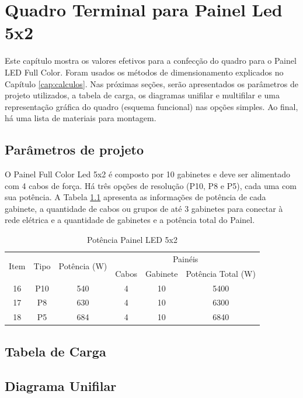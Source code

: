 \chapter{Quadro Terminal para Painel Led 5x2}

Este capítulo mostra os valores efetivos para a confecção do quadro para o Painel LED Full Color. Foram usados os métodos de dimensionamento explicados no Capítulo \ref{cap:calculos}. Nas próximas seções, serão apresentados os parâmetros de projeto utilizados, a tabela de carga, os diagramas unifilar e multifilar e uma representação gráfica do quadro (esquema funcional) nas opções simples. Ao final, há uma lista de materiais para montagem.

\section{Parâmetros de projeto}

O Painel Full Color Led 5x2 é composto por 10 gabinetes e deve ser alimentado com 4 cabos de força. Há três opções de resolução (P10, P8 e P5), cada uma com sua potência. A Tabela \ref{tab:pot_5x2} apresenta as informações de potência de cada gabinete, a quantidade de cabos ou grupos de até 3 gabinetes para conectar à rede elétrica e a quantidade de gabinetes e a potência total do Painel.

\begin{table}[htbp]
\caption{Potência Painel LED 5x2}
\centering
\begin{tabular}{cccccc}
\toprule
\multirow{2}{*}{Item} & \multirow{2}{*}{Tipo} & \multirow{2}{*}{Potência (W)} & \multicolumn{3}{c}{Painéis} \\
\cmidrule{4-6}
& & & Cabos  & Gabinete & Potência Total (W) \\
\midrule


16 & P10 & 540 & 4 & 10 & 5400 \\
17 & P8 & 630 & 4 & 10 & 6300 \\
18 & P5 & 684 & 4 & 10 & 6840 \\


\bottomrule
\end{tabular}
\label{tab:pot_5x2}
\end{table}


\section{Tabela de Carga}
\section{Diagrama Unifilar}
